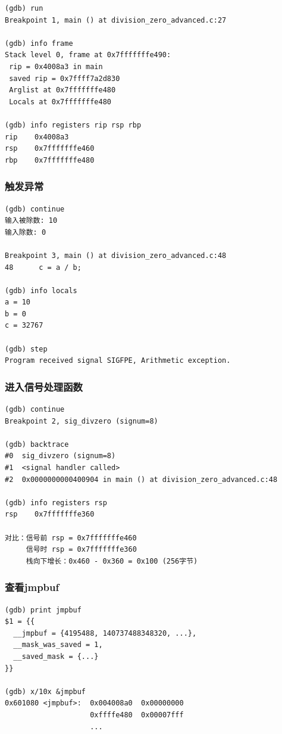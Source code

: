 \documentclass[UTF8,a4paper,12pt]{ctexart}
\begin{document}
\begin{lstlisting}[style=bashstyle,caption={查看栈帧信息}]
(gdb) run
Breakpoint 1, main () at division_zero_advanced.c:27

(gdb) info frame
Stack level 0, frame at 0x7fffffffe490:
 rip = 0x4008a3 in main
 saved rip = 0x7ffff7a2d830
 Arglist at 0x7fffffffe480
 Locals at 0x7fffffffe480

(gdb) info registers rip rsp rbp
rip    0x4008a3
rsp    0x7fffffffe460
rbp    0x7fffffffe480
\end{lstlisting}

\subsubsection{触发异常}

\begin{lstlisting}[style=bashstyle,caption={单步执行到除法}]
(gdb) continue
输入被除数: 10
输入除数: 0

Breakpoint 3, main () at division_zero_advanced.c:48
48      c = a / b;

(gdb) info locals
a = 10
b = 0
c = 32767

(gdb) step
Program received signal SIGFPE, Arithmetic exception.
\end{lstlisting}

\subsubsection{进入信号处理函数}

\begin{lstlisting}[style=bashstyle,caption={查看信号处理调用栈}]
(gdb) continue
Breakpoint 2, sig_divzero (signum=8)

(gdb) backtrace
#0  sig_divzero (signum=8)
#1  <signal handler called>
#2  0x0000000000400904 in main () at division_zero_advanced.c:48

(gdb) info registers rsp
rsp    0x7fffffffe360

对比：信号前 rsp = 0x7fffffffe460
     信号时 rsp = 0x7fffffffe360
     栈向下增长：0x460 - 0x360 = 0x100 (256字节)
\end{lstlisting}

\subsubsection{查看jmpbuf}

\begin{lstlisting}[style=bashstyle,caption={查看保存的环境}]
(gdb) print jmpbuf
$1 = {{
  __jmpbuf = {4195488, 140737488348320, ...},
  __mask_was_saved = 1,
  __saved_mask = {...}
}}

(gdb) x/10x &jmpbuf
0x601080 <jmpbuf>:  0x004008a0  0x00000000
                    0xffffe480  0x00007fff
                    ...
\end{lstlisting}
\end{document}
